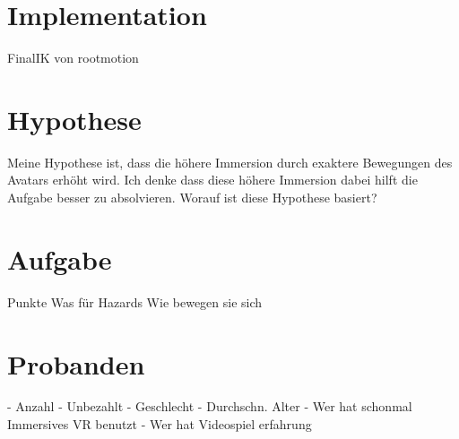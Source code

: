\section{Implementation}
FinalIK von rootmotion \cite{rootmotion}

\section{Hypothese}
Meine Hypothese ist, dass die höhere Immersion durch exaktere Bewegungen des Avatars erhöht wird. Ich denke dass diese höhere Immersion dabei hilft die Aufgabe besser zu absolvieren.
Worauf ist diese Hypothese basiert?


 
\section{Aufgabe}
 Punkte
 Was für Hazards
 Wie bewegen sie sich

\section{Probanden}
- Anzahl
- Unbezahlt
- Geschlecht
- Durchschn. Alter
- Wer hat schonmal Immersives VR benutzt
- Wer hat Videospiel erfahrung

